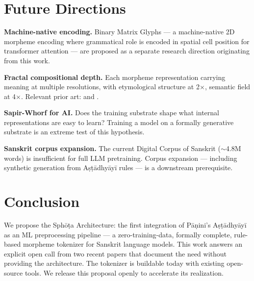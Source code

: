 \documentclass[11pt]{article}
\begin{document}
\section{Future Directions}

\textbf{Machine-native encoding.} Binary Matrix Glyphs --- a machine-native 2D morpheme encoding where grammatical role is encoded in spatial cell position for transformer attention --- are proposed as a separate research direction originating from this work.

\textbf{Fractal compositional depth.} Each morpheme representation carrying meaning at multiple resolutions, with etymological structure at 2$\times$, semantic field at 4$\times$. Relevant prior art: \citet{kusupati2022} and \citet{nawrot2022}.

\textbf{Sapir-Whorf for AI.} Does the training substrate shape what internal representations are easy to learn? Training a model on a formally generative substrate is an extreme test of this hypothesis.

\textbf{Sanskrit corpus expansion.} The current Digital Corpus of Sanskrit ($\sim$4.8M words) is insufficient for full LLM pretraining. Corpus expansion --- including synthetic generation from A\d{s}\d{t}\={a}dhy\={a}y\={i} rules --- is a downstream prerequisite.

\section{Conclusion}

We propose the Sph\=o\d{t}a Architecture: the first integration of P\={a}\d{n}ini's A\d{s}\d{t}\={a}dhy\={a}y\={i} as an ML preprocessing pipeline --- a zero-training-data, formally complete, rule-based morpheme tokenizer for Sanskrit language models. This work answers an explicit open call from two recent papers \citep{srikant2025,kumar2026} that document the need without providing the architecture. The tokenizer is buildable today with existing open-source tools. We release this proposal openly to accelerate its realization.



\end{document}
